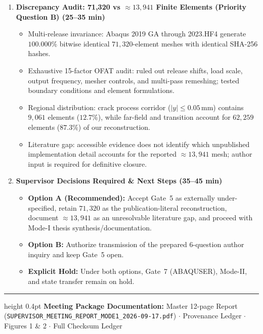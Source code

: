 \documentclass[10pt,a4paper]{article}
\begin{document}
\begin{enumerate}[label=\textbf{\arabic*.},leftmargin=5mm,itemsep=3pt,topsep=2pt]
  \item \textbf{Discrepancy Audit: 71,320 vs $\approx 13{,}941$ Finite Elements (Priority Question B) (25--35 min)}
  \begin{itemize}[itemsep=1pt,topsep=1pt,leftmargin=4mm]
    \small
    \item Multi-release invariance: Abaqus 2019 GA through 2023.HF4 generate $100.000\%$ bitwise identical $71{,}320$-element meshes with identical SHA-256 hashes.
    \item Exhaustive 15-factor OFAT audit: ruled out release shifts, load scale, output frequency, mesher controls, and multi-pass remeshing; tested boundary conditions and element formulations.
    \item Regional distribution: crack process corridor ($|y| \le 0.05\,\mathrm{mm}$) contains $9{,}061$ elements ($12.7\%$), while far-field and transition account for $62{,}259$ elements ($87.3\%$) of our reconstruction.
    \item Literature gap: accessible evidence does not identify which unpublished implementation detail accounts for the reported $\approx 13{,}941$ mesh; author input is required for definitive closure.
  \end{itemize}

  \item \textbf{Supervisor Decisions Required \& Next Steps (35--45 min)}
  \begin{itemize}[itemsep=1pt,topsep=1pt,leftmargin=4mm]
    \small
    \item \textbf{Option A (Recommended):} Accept Gate~5 as externally under-specified, retain $71{,}320$ as the publication-literal reconstruction, document $\approx 13{,}941$ as an unresolvable literature gap, and proceed with Mode-I thesis synthesis/documentation.
    \item \textbf{Option B:} Authorize transmission of the prepared 6-question author inquiry and keep Gate~5 open.
    \item \textbf{Explicit Hold:} Under both options, Gate~7 (ABAQUSER), Mode-II, and state transfer remain on hold.
  \end{itemize}
\end{enumerate}

\vfill
\hrule height 0.4pt
\vspace{0.2em}
{\scriptsize\textbf{Meeting Package Documentation:} Master 12-page Report (\texttt{SUPERVISOR\_MEETING\_REPORT\_MODE1\_2026-09-17.pdf}) $\cdot$ Provenance Ledger $\cdot$ Figures 1 \& 2 $\cdot$ Full Checksum Ledger}
\end{document}
